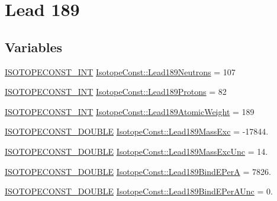 \hypertarget{group___isotope_const-_lead-_pb189}{}\section{Lead 189}
\label{group___isotope_const-_lead-_pb189}
\subsection*{Variables}
\begin{DoxyCompactItemize}
\item 
\mbox{\hyperlink{group___isotope_const-_macros_ga5f18360b3e99483a35c32d789e62621c}{I\+S\+O\+T\+O\+P\+E\+C\+O\+N\+S\+T\+\_\+\+I\+NT}} \mbox{\hyperlink{group___isotope_const-_lead-_pb189_ga1aeb40e67e773efe05158e8c89cc7ba8}{Isotope\+Const\+::\+Lead189\+Neutrons}} = 107
\item 
\mbox{\hyperlink{group___isotope_const-_macros_ga5f18360b3e99483a35c32d789e62621c}{I\+S\+O\+T\+O\+P\+E\+C\+O\+N\+S\+T\+\_\+\+I\+NT}} \mbox{\hyperlink{group___isotope_const-_lead-_pb189_gab79be5c804678cb09df909834d82d78d}{Isotope\+Const\+::\+Lead189\+Protons}} = 82
\item 
\mbox{\hyperlink{group___isotope_const-_macros_ga5f18360b3e99483a35c32d789e62621c}{I\+S\+O\+T\+O\+P\+E\+C\+O\+N\+S\+T\+\_\+\+I\+NT}} \mbox{\hyperlink{group___isotope_const-_lead-_pb189_gaf3a9e4e658891198340e231dde4169ab}{Isotope\+Const\+::\+Lead189\+Atomic\+Weight}} = 189
\item 
\mbox{\hyperlink{group___isotope_const-_macros_ga8f45a7272ce02c0b4c65c44636ed719a}{I\+S\+O\+T\+O\+P\+E\+C\+O\+N\+S\+T\+\_\+\+D\+O\+U\+B\+LE}} \mbox{\hyperlink{group___isotope_const-_lead-_pb189_gac300c3b92cdce1c57647b22df8222e62}{Isotope\+Const\+::\+Lead189\+Mass\+Exc}} = -\/17844.
\item 
\mbox{\hyperlink{group___isotope_const-_macros_ga8f45a7272ce02c0b4c65c44636ed719a}{I\+S\+O\+T\+O\+P\+E\+C\+O\+N\+S\+T\+\_\+\+D\+O\+U\+B\+LE}} \mbox{\hyperlink{group___isotope_const-_lead-_pb189_gae88503ad80d3337d4f5c5f7ec3c828a3}{Isotope\+Const\+::\+Lead189\+Mass\+Exc\+Unc}} = 14.
\item 
\mbox{\hyperlink{group___isotope_const-_macros_ga8f45a7272ce02c0b4c65c44636ed719a}{I\+S\+O\+T\+O\+P\+E\+C\+O\+N\+S\+T\+\_\+\+D\+O\+U\+B\+LE}} \mbox{\hyperlink{group___isotope_const-_lead-_pb189_ga5c1ba137847bd22cffa16084cc810b4a}{Isotope\+Const\+::\+Lead189\+Bind\+E\+PerA}} = 7826.
\item 
\mbox{\hyperlink{group___isotope_const-_macros_ga8f45a7272ce02c0b4c65c44636ed719a}{I\+S\+O\+T\+O\+P\+E\+C\+O\+N\+S\+T\+\_\+\+D\+O\+U\+B\+LE}} \mbox{\hyperlink{group___isotope_const-_lead-_pb189_ga603a35bd8abacf3064dd95849811b15b}{Isotope\+Const\+::\+Lead189\+Bind\+E\+Per\+A\+Unc}} = 0.

\end{DoxyCompactItemize}
